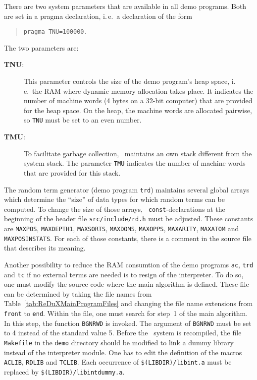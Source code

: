 There are two system parameters that are available in all demo programs.
Both are set in a pragma declaration, i.\,e.\ a declaration of the form
\begin{quote}
\begin{verbatim}
pragma TNU=100000.
\end{verbatim}
\end{quote}
The two parameters are:
\begin{description}
\item[{\bf TNU}:] This parameter controls the size of the demo program's
heap space, i.\,e.\ the RAM where dynamic memory allocation takes place.
It indicates the number of machine words (4 bytes on a 32-bit computer)
that are provided for the heap space.
On the heap, the machine words are allocated pairwise, so {\tt TNU}
must be set to an even number.

\item[{\bf TMU}:] To facilitate garbage collection, \ALDES\ maintains
an own stack different from the system stack. The parameter
{\tt TMU} indicates the number of machine words that are provided
for this stack.

\end{description}

The random term generator (demo program {\tt trd}) maintains several
global arrays which determine the ``size'' of data types for which
random terms can be computed. To change the size of those arrays, {\tt
const}-declarations at the beginning of the header file
{\tt src/include/rd.h} must be adjusted. These constants are
{\tt MAXPOS}, {\tt MAXDEPTH1}, {\tt MAXSORTS}, {\tt MAXDOMS},
{\tt MAXOPPS}, {\tt MAXARITY}, {\tt MAXATOM} and {\tt MAXPOSINSTATS}.
For each of those constants, there is a comment in the source file
that describes its meaning.

Another possibility to reduce the RAM consumtion of the demo programs
{\tt ac}, {\tt trd} and {\tt tc} if no external terms are needed is to 
resign of the interpreter. To do so, one must modify the source code where
the main algorithm is defined. These file can be determined by taking
the file names from Table~\ref{tab:ReDuXMainProgramFiles} and
changing the file name extensions from {\tt front} to {\tt end}.
Within the file, one must search for step~1 of the main algorithm.
In this step, the function {\tt BGNRWD} is invoked. The argument of
{\tt BGNRWD} must be set to 4 instead of the standard value 5.
Before the \redux\ system is recompiled, the file {\tt Makefile}
in the {\tt demo} directory should be modified to link a dummy library
instead of the interpreter module. One has to edit the definition
of the macros {\tt ACLIB}, {\tt RDLIB} and {\tt TCLIB}. Each occurrence
of \verb!$(LIBDIR)/libint.a! must be replaced by
\verb!$(LIBDIR)/libintdummy.a!.
